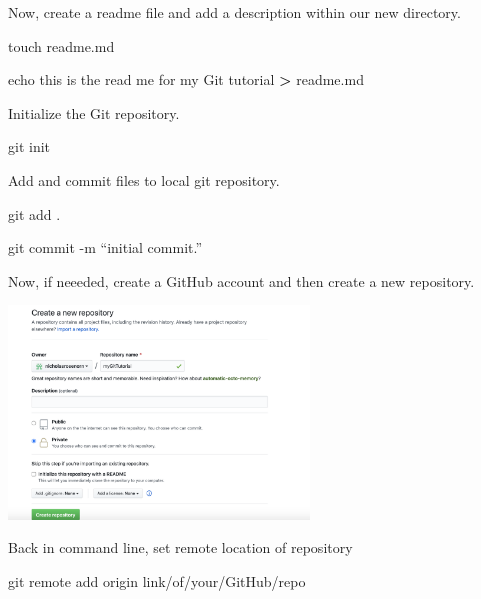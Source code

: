 \documentclass[]{book}
\newenvironment{Shaded}{\begin{snugshade}}{\end{snugshade}}
\newcommand{\FunctionTok}[1]{\textcolor[rgb]{0.00,0.00,0.00}{#1}}
\newcommand{\OperatorTok}[1]{\textcolor[rgb]{0.81,0.36,0.00}{\textbf{#1}}}
\newcommand{\BuiltInTok}[1]{#1}
\newcommand{\NormalTok}[1]{#1}
\begin{document}
Now, create a readme file and add a description within our new
directory.

\begin{Shaded}
\begin{Highlighting}[]
\FunctionTok{touch}\NormalTok{ readme.md}

\BuiltInTok{echo}\NormalTok{ this is the read me for my Git tutorial }\OperatorTok{>}\NormalTok{ readme.md}
\end{Highlighting}
\end{Shaded}

Initialize the Git repository.

\begin{Shaded}
\begin{Highlighting}[]
\FunctionTok{git}\NormalTok{ init}
\end{Highlighting}
\end{Shaded}

Add and commit files to local git repository.

\begin{Shaded}
\begin{Highlighting}[]
\FunctionTok{git}\NormalTok{ add .}

\FunctionTok{git}\NormalTok{ commit -m “initial commit.”}
\end{Highlighting}
\end{Shaded}

Now, if neeeded, create a GitHub account and then create a new
repository.

\includegraphics[width=0.60000\textwidth]{images/create new git repo.png}

Back in command line, set remote location of repository

\begin{Shaded}
\begin{Highlighting}[]
\FunctionTok{git}\NormalTok{ remote add origin link/of/your/GitHub/repo}
\end{Highlighting}
\end{Shaded}
\end{document}
